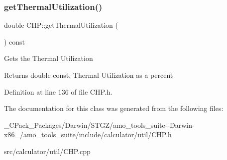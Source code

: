\mbox{\label{class_c_h_p_aa27fd9e66e208e6b3f28fdfe182d6c32}} 
\subsubsection{\texorpdfstring{get\+Thermal\+Utilization()}{getThermalUtilization()}\hspace{0.1cm}{\footnotesize\ttfamily [3/3]}}
{\footnotesize\ttfamily double C\+H\+P\+::get\+Thermal\+Utilization (\begin{DoxyParamCaption}{ }\end{DoxyParamCaption}) const\hspace{0.3cm}{\ttfamily [inline]}}

Gets the Thermal Utilization

\begin{DoxyReturn}{Returns}
double const, Thermal Utilization as a percent 
\end{DoxyReturn}


Definition at line 136 of file C\+H\+P.\+h.



The documentation for this class was generated from the following files\+:\begin{DoxyCompactItemize}
\item 
\+\_\+\+C\+Pack\+\_\+\+Packages/\+Darwin/\+S\+T\+G\+Z/amo\+\_\+tools\+\_\+suite-\/-\/\+Darwin-\/x86\+\_/amo\+\_\+tools\+\_\+suite/include/calculator/util/C\+H\+P.\+h\item 
src/calculator/util/C\+H\+P.\+cpp\end{DoxyCompactItemize}
